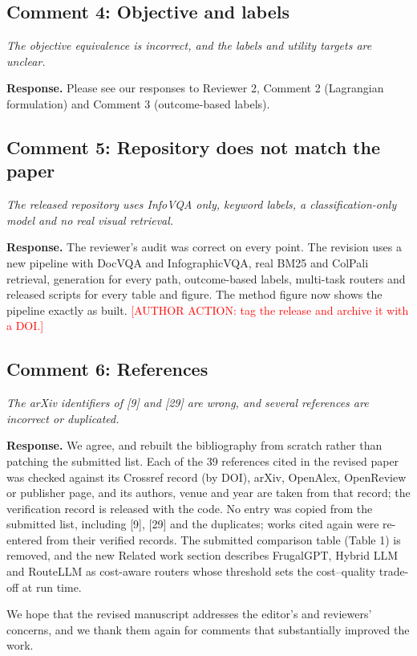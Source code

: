 \documentclass[11pt]{article}
\newcommand{\reviewer}[1]{{\color{blue!55!black}\itshape #1\par}}
\begin{document}
\subsection*{Comment 4: Objective and labels}
\reviewer{The objective equivalence is incorrect, and the labels and utility targets are unclear.}
\textbf{Response.} Please see our responses to Reviewer 2, Comment 2 (Lagrangian formulation) and Comment 3 (outcome-based labels).

\subsection*{Comment 5: Repository does not match the paper}
\reviewer{The released repository uses InfoVQA only, keyword labels, a classification-only model and no real visual retrieval.}
\textbf{Response.} The reviewer's audit was correct on every point. The revision uses a new pipeline with DocVQA and InfographicVQA, real BM25 and ColPali retrieval, generation for every path, outcome-based labels, multi-task routers and released scripts for every table and figure. The method figure now shows the pipeline exactly as built. \textcolor{red}{[AUTHOR ACTION: tag the release and archive it with a DOI.]}

\subsection*{Comment 6: References}
\reviewer{The arXiv identifiers of [9] and [29] are wrong, and several references are incorrect or duplicated.}
\textbf{Response.} We agree, and rebuilt the bibliography from scratch rather than patching the submitted list. Each of the 39 references cited in the revised paper was checked against its Crossref record (by DOI), arXiv, OpenAlex, OpenReview or publisher page, and its authors, venue and year are taken from that record; the verification record is released with the code. No entry was copied from the submitted list, including [9], [29] and the duplicates; works cited again were re-entered from their verified records. The submitted comparison table (Table 1) is removed, and the new Related work section describes FrugalGPT, Hybrid LLM and RouteLLM as cost-aware routers whose threshold sets the cost--quality trade-off at run time.

We hope that the revised manuscript addresses the editor's and reviewers' concerns, and we thank them again for comments that substantially improved the work.
\end{document}
